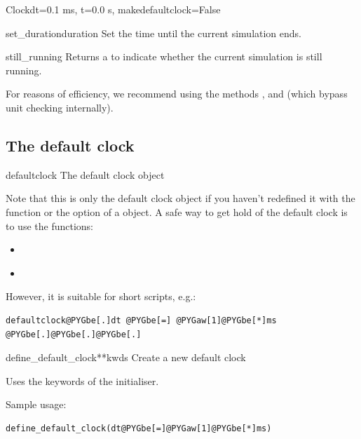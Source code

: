 \documentclass[letterpaper,10pt]{manual}
\begin{document}
\begin{classdesc}{Clock}{dt=0.1 ms, t=0.0 s, makedefaultclock=False}
\hypertarget{brian.Clock.set_duration}{}\begin{methoddesc}{set\_duration}{duration}
Set the time until the current simulation ends.
\end{methoddesc}


\hypertarget{brian.Clock.still_running}{}\begin{methoddesc}{still\_running}{}
Returns a  to indicate whether the current
simulation is still running.
\end{methoddesc}

For reasons of efficiency, we recommend using the methods
\hyperlink{brian.Clock.tick}{}, \hyperlink{brian.Clock.set_duration}{} and \hyperlink{brian.Clock.still_running}{}
(which bypass unit checking internally).
\end{classdesc}

\subsection{The default clock}


\hypertarget{brian.defaultclock}{}\begin{datadesc}{defaultclock}
The default clock object

Note that this is only the default clock object if you haven't
redefined it with the \hyperlink{brian.define_default_clock}{} function or the
 option of a \hyperlink{brian.Clock}{} object. A safe way to
get hold of the default clock is to use the functions:
\begin{itemize}
\item {} 
\hyperlink{brian.get_default_clock}{}

\item {} 
\hyperlink{brian.reinit_default_clock}{}

\end{itemize}

However, it is suitable for short scripts, e.g.:

\begin{Verbatim}[commandchars=@\[\]]
defaultclock@PYGbe[.]dt @PYGbe[=] @PYGaw[1]@PYGbe[*]ms
@PYGbe[.]@PYGbe[.]@PYGbe[.]
\end{Verbatim}
\end{datadesc}


\hypertarget{brian.define_default_clock}{}\begin{funcdesc}{define\_default\_clock}{**kwds}
Create a new default clock

Uses the keywords of the \hyperlink{brian.Clock}{} initialiser.

Sample usage:

\begin{Verbatim}[commandchars=@\[\]]
define_default_clock(dt@PYGbe[=]@PYGaw[1]@PYGbe[*]ms)
\end{Verbatim}
\end{funcdesc}
\end{document}
